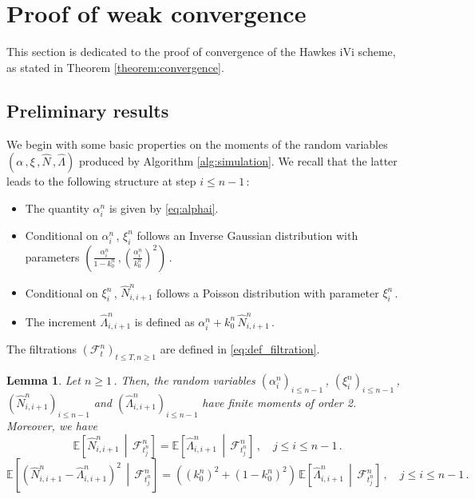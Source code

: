 \documentclass{article}
\newcommand{\1}{\mathbbm{1}}
\newtheorem{lemma}[theorem]{Lemma}
\numberwithin{equation}{section}
\begin{document}
\section{Proof of weak convergence}
\label{sect:convergence_proof}
This section is dedicated to the proof of convergence of the Hawkes iVi scheme, as stated in Theorem \ref{theorem:convergence}.
\subsection{Preliminary results}
We begin with some basic properties on the moments of the random variables $\left(\alpha\,,\xi\,,\widehat N\,, \widehat \Lambda\right)$ produced by Algorithm \ref{alg:simulation}. We recall that the latter leads to the following structure at step $i \leq n-1\,$:
    \begin{itemize}
        \item The quantity $\alpha^n_i$ is given by \eqref{eq:alphai}.
        \item Conditional on $\alpha^n_i\,$, $\xi^n_i$ follows an Inverse Gaussian distribution with parameters $\left(\frac{\alpha^n_i}{1 - k_0^n}\,, \left(\frac{\alpha^n_i}{k_0^n} \right)^2 \right)\,$.
        \item Conditional on $\xi^n_i\,$, $\widehat N^n_{i,i+1}$ follows a Poisson distribution with parameter $\xi^n_i\,$.
        \item The increment $\widehat \Lambda^n_{i,i+1}$ is defined as $\alpha^n_i + k_0^n\,\widehat N^n_{i,i+1}\,$.
    \end{itemize}
    The filtrations $\left(\mathcal F^n_t\right)_{t \leq T, n \geq 1}$ are defined in \eqref{eq:def_filtration}.
\begin{lemma}    
\label{lemma:estimates_random_variables}
Let $n \geq 1\,$. Then, the random variables $\left(\alpha^n_i\right)_{i \leq n-1}\,$, $\left(\xi^n_i\right)_{i \leq n-1}\,$, $\left(\widehat N^n_{i,i+1}\right)_{i \leq n-1}$ and $\left(\widehat \Lambda^n_{i,i+1}\right)_{i \leq n-1}$ have finite moments of order 2. Moreover, we have
    \begin{equation}
    \label{eq:exp_N_hat}
    \mathbb E \left[\widehat N^n_{i,i+1}\,\middle|\,\mathcal F^n_{t^n_j} \right] =  \mathbb E \left[\widehat \Lambda^n_{i,i+1} \,\middle|\,\mathcal F^n_{t^n_j}\right]\,, \quad j \leq i\leq n-1\,.
    \end{equation}
    \begin{equation}
        \label{eq:exp_Z_hat_squared}
        \mathbb E \left[\left(\widehat N^n_{i,i+1} - \widehat \Lambda^n_{i,i+1}\right)^2\,\middle|\,\mathcal F^n_{t^n_j} \right] = \left(\left(k_0^n\right)^2 + \left(1 - k_0^n\right)^2\right)\, \mathbb E \left[ \widehat \Lambda^n_{i,i+1}\,\middle|\,\mathcal F^n_{t^n_j} \right]\,, \quad j \leq  i \leq n-1\,.
    \end{equation}
\end{lemma}
\end{document}
